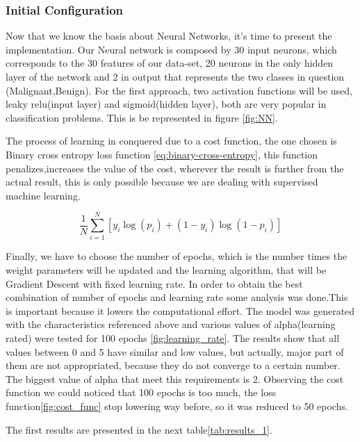 \documentclass[12pt,a4paper,twocolumn]{article}
\begin{document}
\subsubsection{Initial Configuration}
 \par Now that we know the basis about Neural Networks, it's time to present  the implementation. Our Neural network is composed by 30 input neurons, which corresponds to the 30 features of our data-set, 20 neurons in the only hidden layer of the network and 2 in output that represents the two classes  in question (Malignant,Benign). For the first approach, two activation functions will be used, leaky relu(input layer) and sigmoid(hidden layer), both are very popular in classification problems. This is be represented in figure \ref{fig:NN}.
 \par The process of learning in conquered due to a cost function, the one chosen is Binary cross entropy loss function \ref{eq:binary-cross-entropy}, this function penalizes,increases the value of the cost, wherever the result is further from the actual result, this is only possible because we are dealing with supervised machine learning.
 
\begin{equation}\label{eq:binary-cross-entropy}
 \frac{1}{N} \sum_{i=1}^{N} [y_i \log(p_i) + (1 - y_i) \log(1 - p_i)]
\end{equation}
\par Finally, we have to choose the number of epochs, which is the number times the weight parameters will be updated and the learning algorithm, that  will be  Gradient Descent with fixed learning rate. In order to obtain the best combination of number of epochs and learning rate some analysis was done.This is important because it lowers the computational effort.  The model was generated with the characteristics referenced above and various values of alpha(learning rated) were tested for 100 epochs \ref{fig:learning_rate}. The results show that all values between 0 and 5 have similar and low values, but actually, major part of them are not appropriated, because they do not converge to a certain number. The biggest value of alpha that meet this requirements is  2. Observing the cost function we could noticed that 100 epochs is too much, the loss function\ref{fig:cost_func} stop lowering way before, so it was reduced to 50 epochs.
\par The first results are presented in the next table\ref{tab:results_1}.
\end{document}
